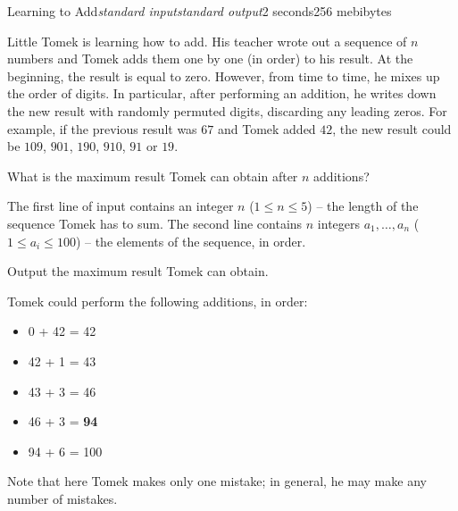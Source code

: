 \begin{problem}{Learning to Add}{\textsl{standard input}}{\textsl{standard output}}{2 seconds}{256 mebibytes}{}

  Little Tomek is learning how to add.
  His teacher wrote out a sequence of $n$ numbers and Tomek adds them one by one (in order) to his result. At the beginning, the result is
  equal to zero.  However, from time to time, he mixes up the order of digits.
  In particular, after performing an addition, he writes down the new result with randomly permuted digits,
  discarding any leading zeros.
  For example, if the previous result was $67$ and Tomek added $42$, the new result could be $109$, $901$, $190$, $910$, $91$ or $19$.

  What is the maximum result Tomek can obtain after $n$ additions?

\InputFile
  The first line of input contains an integer $n$ ($1 \leq n \leq 5$) -- the length of the sequence Tomek has to sum.
  The second line contains $n$ integers $a_1, \ldots, a_n$ ($1 \leq a_i \leq 100$) -- the elements of the sequence, in order.

\OutputFile
  Output the maximum result Tomek can obtain.

\Examples
\begin{example}
%
\end{example}

\Note

    Tomek could perform the following additions, in order:
    \begin{itemize}
        \item 0 + 42 = 42
        \item 42 + 1 = 43
        \item 43 + 3 = 46
        \item 46 + 3 = \textbf{94}
        \item 94 + 6 = 100
    \end{itemize}
    Note that here Tomek makes only one mistake; in general, he may make any number of mistakes.

\end{problem}
